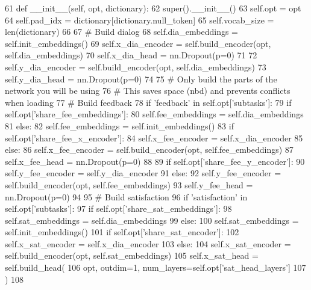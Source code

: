 \begin{DoxyCode}
61     \textcolor{keyword}{def }\_\_init\_\_(self, opt, dictionary):
62         super().\_\_init\_\_()
63         self.opt = opt
64         self.pad\_idx = dictionary[dictionary.null\_token]
65         self.vocab\_size = len(dictionary)
66 
67         \textcolor{comment}{# Build dialog}
68         self.dia\_embeddings = self.init\_embeddings()
69         self.x\_dia\_encoder = self.build\_encoder(opt, self.dia\_embeddings)
70         self.x\_dia\_head = nn.Dropout(p=0)
71 
72         self.y\_dia\_encoder = self.build\_encoder(opt, self.dia\_embeddings)
73         self.y\_dia\_head = nn.Dropout(p=0)
74 
75         \textcolor{comment}{# Only build the parts of the network you will be using}
76         \textcolor{comment}{# This saves space (nbd) and prevents conflicts when loading}
77         \textcolor{comment}{# Build feedback}
78         \textcolor{keywordflow}{if} \textcolor{stringliteral}{'feedback'} \textcolor{keywordflow}{in} self.opt[\textcolor{stringliteral}{'subtasks'}]:
79             \textcolor{keywordflow}{if} self.opt[\textcolor{stringliteral}{'share\_fee\_embeddings'}]:
80                 self.fee\_embeddings = self.dia\_embeddings
81             \textcolor{keywordflow}{else}:
82                 self.fee\_embeddings = self.init\_embeddings()
83             \textcolor{keywordflow}{if} self.opt[\textcolor{stringliteral}{'share\_fee\_x\_encoder'}]:
84                 self.x\_fee\_encoder = self.x\_dia\_encoder
85             \textcolor{keywordflow}{else}:
86                 self.x\_fee\_encoder = self.build\_encoder(opt, self.fee\_embeddings)
87             self.x\_fee\_head = nn.Dropout(p=0)
88 
89             \textcolor{keywordflow}{if} self.opt[\textcolor{stringliteral}{'share\_fee\_y\_encoder'}]:
90                 self.y\_fee\_encoder = self.y\_dia\_encoder
91             \textcolor{keywordflow}{else}:
92                 self.y\_fee\_encoder = self.build\_encoder(opt, self.fee\_embeddings)
93             self.y\_fee\_head = nn.Dropout(p=0)
94 
95         \textcolor{comment}{# Build satisfaction}
96         \textcolor{keywordflow}{if} \textcolor{stringliteral}{'satisfaction'} \textcolor{keywordflow}{in} self.opt[\textcolor{stringliteral}{'subtasks'}]:
97             \textcolor{keywordflow}{if} self.opt[\textcolor{stringliteral}{'share\_sat\_embeddings'}]:
98                 self.sat\_embeddings = self.dia\_embeddings
99             \textcolor{keywordflow}{else}:
100                 self.sat\_embeddings = self.init\_embeddings()
101             \textcolor{keywordflow}{if} self.opt[\textcolor{stringliteral}{'share\_sat\_encoder'}]:
102                 self.x\_sat\_encoder = self.x\_dia\_encoder
103             \textcolor{keywordflow}{else}:
104                 self.x\_sat\_encoder = self.build\_encoder(opt, self.sat\_embeddings)
105             self.x\_sat\_head = self.build\_head(
106                 opt, outdim=1, num\_layers=self.opt[\textcolor{stringliteral}{'sat\_head\_layers'}]
107             )
108 
\end{DoxyCode}


